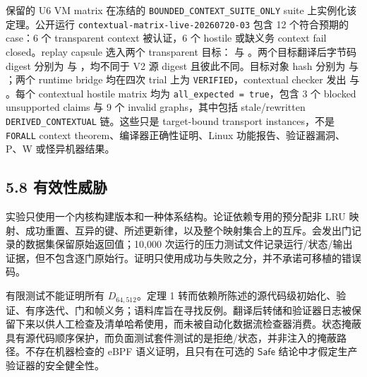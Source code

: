 \documentclass[
  11pt,
  a4paper,
]{ctexart}
\begin{document}
保留的 U6 VM matrix 在冻结的 \texttt{BOUNDED\_CONTEXT\_SUITE\_ONLY}
suite 上实例化该定理。公开运行
\texttt{contextual-matrix-live-20260720-03} 包含 12 个符合预期的 case：6
个 transparent context 被认证，6 个 hostile 或缺义务 context fail
closed。replay capsule 选入两个 transparent
目标： 与
。两个目标翻译后字节码 digest 分别为
与
，均不同于
V2 源 digest 且彼此不同。目标对象 hash 分别为
与
；两个
runtime bridge 均在四次 trial 上为 \texttt{VERIFIED}，contextual checker
发出
与
。每个
contextual hostile matrix 均为 \texttt{all\_expected\ =\ true}，包含 3
个 blocked unsupported claims 与 9 个 invalid graphs，其中包括
stale/rewritten \texttt{DERIVED\_CONTEXTUAL} 链。这些只是 target-bound
transport instances，不是 \texttt{FORALL} context
theorem、编译器正确性证明、Linux 功能报告、验证器漏洞、P、W
或怪异机器结果。

\hypertarget{58-ux6709ux6548ux6027ux5a01ux80c1}{%
\subsection{5.8 有效性威胁}\label{58-ux6709ux6548ux6027ux5a01ux80c1}}

实验只使用一个内核构建版本和一种体系结构。论证依赖专用的预分配非 LRU
映射、成功重置、互异的键、所述更新律，以及整个映射集合上的互斥。会发出门记录的数据集保留原始返回值；10,000
次运行的压力测试文件记录运行/状态/输出证据，但不包含逐门原始行。证明只使用成功与失败之分，并不承诺可移植的错误码。

有限测试不能证明所有 \(D_{64,512}\)。定理 1
转而依赖所陈述的源代码级初始化、验证、有序迭代、门和帧义务；语料库旨在寻找反例。翻译后转储和验证器日志被保留下来以供人工检查及清单哈希使用，而未被自动化数据流检查器消费。状态掩蔽具有源代码顺序保护，而负面测试套件测试的是拒绝/状态，并非注入的掩蔽路径。不存在机器检查的
eBPF 语义证明，且只有在可选的 \(\mathsf{Safe}\)
结论中才假定生产验证器的安全健全性。
\end{document}
